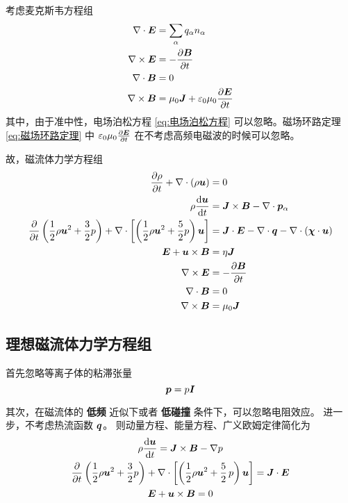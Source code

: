 考虑麦克斯韦方程组
\begin{subequations}\begin{align}
\nabla \cdot {\bm{E}} &= \sum_\alpha q_\alpha n_\alpha \label{eq:电场泊松方程}\\
\nabla \times {\bm{E}} &= - \frac{\partial {\bm{B}}}{\partial {t}} \\
\nabla \cdot {\bm{B}} &= 0 \\
\nabla \times {\bm{B}} &= \mu_0 \bm{J} + \varepsilon_0 \mu_0 \frac{\partial {\bm{E}}}{\partial {t}} \label{eq:磁场环路定理}
\end{align}\end{subequations}
其中，由于准中性，电场泊松方程 \ref{eq:电场泊松方程} 可以忽略。磁场环路定理 \ref{eq:磁场环路定理} 中 $\varepsilon_0 \mu_0 \frac{\partial {\bm{E}}}{\partial {t}}$ 在不考虑高频电磁波的时候可以忽略。

故，磁流体力学方程组
\begin{subequations}\begin{align}
\frac{\partial {\rho}}{\partial {t}} + \nabla \cdot {\left(\rho \bm{u}\right)} &= 0 \\
\rho \frac{\mathop{}\!\mathrm{d} {\bm{u}}}{\mathop{}\!\mathrm{d} {t}} &= \bm{J} \times \bm{B} - \nabla \cdot {\bm{p}_\alpha} \\
\frac{\partial {}}{\partial {t}} \left(
    \frac{1}{2} \rho \bm{u}^2 + \frac{3}{2} p
\right)
+ \nabla \cdot {\left[\left(\frac{1}{2} \rho \bm{u}^2 + \frac{5}{2} p \right) \bm{u} \right]}
&= \bm{J} \cdot \bm{E}
- \nabla \cdot {\bm{q}} - \nabla \cdot {(\bm{\chi} \cdot \bm{u})} \\
\bm{E} + \bm{u} \times \bm{B} &= \eta \bm{J} \\
\nabla \times {\bm{E}} &= - \frac{\partial {\bm{B}}}{\partial {t}} \\
\nabla \cdot {\bm{B}} &= 0 \\
\nabla \times {\bm{B}} &= \mu_0 \bm{J} \label{eq:02MHD_欧姆}
\end{align}\end{subequations}

\subsection{理想磁流体力学方程组}

首先忽略等离子体的粘滞张量
\begin{equation}
\bm{p} = p \bm{I}
\end{equation}

其次，在磁流体的 \textbf{低频} 近似下或者 \textbf{低碰撞} 条件下，可以忽略电阻效应。
进一步，不考虑热流函数 $\bm{q}$。
则动量方程、能量方程、广义欧姆定律简化为
\begin{gather}
\rho \frac{\mathop{}\!\mathrm{d} {\bm{u}}}{\mathop{}\!\mathrm{d} {t}} = \bm{J} \times \bm{B} - \nabla {p} \\
\frac{\partial {}}{\partial {t}} \left(
    \frac{1}{2} \rho \bm{u}^2 + \frac{3}{2} p
\right)
+ \nabla \cdot {\left[\left(\frac{1}{2} \rho \bm{u}^2 + \frac{5}{2} \, p \right) \bm{u} \right]}
= \bm{J} \cdot \bm{E} \\
\bm{E} + \bm{u} \times \bm{B} = 0
\end{gather}

